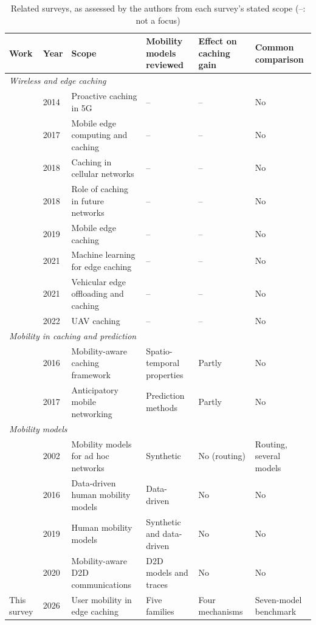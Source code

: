 \begin{table}[t]
\centering
\caption{Related surveys, as assessed by the authors from each survey's stated scope (--: not a focus)}
\label{tab:surveys}
\scriptsize
\renewcommand{\arraystretch}{1.05}
\begin{tabular}{llllll}
\hline
Work & Year & Scope & Mobility models reviewed & Effect on caching gain & Common comparison \\
\hline
\multicolumn{6}{l}{\emph{Wireless and edge caching}} \\
\cite{bastug2014living} & 2014 & Proactive caching in 5G & -- & -- & No \\
\cite{wang2017survey} & 2017 & Mobile edge computing and caching & -- & -- & No \\
\cite{li2018survey} & 2018 & Caching in cellular networks & -- & -- & No \\
\cite{paschos2018role} & 2018 & Role of caching in future networks & -- & -- & No \\
\cite{yao2019mobile} & 2019 & Mobile edge caching & -- & -- & No \\
\cite{shuja2021applying} & 2021 & Machine learning for edge caching & -- & -- & No \\
\cite{dziyauddin2021computation} & 2021 & Vehicular edge offloading and caching & -- & -- & No \\
\cite{duong2022uav} & 2022 & UAV caching & -- & -- & No \\
\multicolumn{6}{l}{\emph{Mobility in caching and prediction}} \\
\cite{wang2016framework} & 2016 & Mobility-aware caching framework & Spatio-temporal properties & Partly & No \\
\cite{bui2017survey} & 2017 & Anticipatory mobile networking & Prediction methods & Partly & No \\
\multicolumn{6}{l}{\emph{Mobility models}} \\
\cite{camp2002survey} & 2002 & Mobility models for ad hoc networks & Synthetic & No (routing) & Routing, several models \\
\cite{hess2016datadriven} & 2016 & Data-driven human mobility models & Data-driven & No & No \\
\cite{solmaz2019survey} & 2019 & Human mobility models & Synthetic and data-driven & No & No \\
\cite{waqas2020survey} & 2020 & Mobility-aware D2D communications & D2D models and traces & No & No \\
\hline
This survey & 2026 & User mobility in edge caching & Five families & Four mechanisms & Seven-model benchmark \\
\end{tabular}
\end{table}

